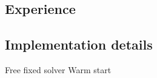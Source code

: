 \subsection{Experience}
\label{sub:experience}
%

\subsection{Implementation details}
\label{sub:experience}
%
Free fixed solver
Warm start

\clearpage
